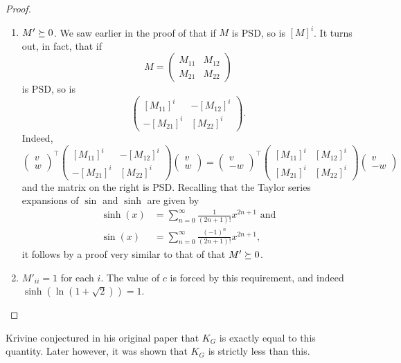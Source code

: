 \begin{proof}
\begin{enumerate}[label=(\alph*)]
			\item $M' \succeq 0$. We saw earlier in the proof of  that if $M$ is PSD, so is $[M]^i$. It turns out, in fact, that if
			\[ M = \begin{pmatrix} M_{11} & M_{12} \\ M_{21} & M_{22} \end{pmatrix} \]
			is PSD, so is
			\[ \begin{pmatrix} [M_{11}]^i & -[M_{12}]^i \\ -[M_{21}]^i & [M_{22}]^i \end{pmatrix}. \]
			Indeed,
			\[ \begin{pmatrix} v \\ w \end{pmatrix}^\top \begin{pmatrix} [M_{11}]^i & -[M_{12}]^i \\ -[M_{21}]^i & [M_{22}]^i \end{pmatrix} \begin{pmatrix} v \\ w \end{pmatrix} = \begin{pmatrix} v \\ -w \end{pmatrix}^\top \begin{pmatrix} [M_{11}]^i & [M_{12}]^i \\ [M_{21}]^i & [M_{22}]^i \end{pmatrix} \begin{pmatrix} v \\ -w \end{pmatrix} \]
			and the matrix on the right is PSD.
			Recalling that the Taylor series expansions of $\sin$ and $\sinh$ are given by
			\begin{align*}
				\sinh(x) &= \sum_{n=0}^{\infty} \frac{1}{(2n+1)!} x^{2n+1} \text{ and} \\
				\sin(x) &= \sum_{n=0}^{\infty} \frac{(-1)^n}{(2n+1)!} x^{2n+1},
			\end{align*}
			it follows by a proof very similar to that of  that $M' \succeq 0$.
			\item $M'_{ii} = 1$ for each $i$. The value of $c$ is forced by this requirement, and indeed $\sinh(\ln(1+\sqrt{2})) = 1$. \qedhere
		\end{enumerate}
	\end{proof}

	Krivine conjectured in his original paper that $K_G$ is exactly equal to this quantity. Later however, it was shown \cite{braverman-krivine} that $K_G$ is strictly less than this.